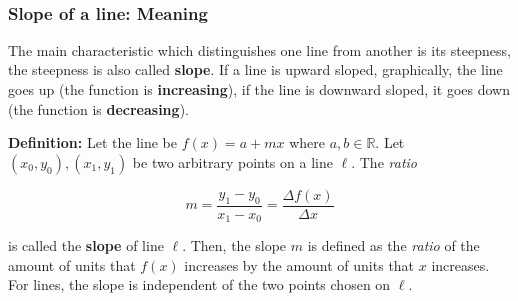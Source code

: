 \documentclass[11pt]{article}
\begin{document}
    \begin{center}
    \end{center}
    { \hspace*{\fill} \\}
    
    \hypertarget{slope-of-a-line-meaning}{%
\subsubsection{Slope of a line: Meaning}\label{slope-of-a-line-meaning}}

The main characteristic which distinguishes one line from another is its
steepness, the steepness is also called \textbf{slope}. If a line is
upward sloped, graphically, the line goes up (the function is
\textbf{increasing}), if the line is downward sloped, it goes down (the
function is \textbf{decreasing}).

\textbf{Definition:} Let the line be \(f(x) = a + m x\) where
\(a,b\in\mathbb{R}\). Let \((x_0,y_0),(x_1,y_1)\) be two arbitrary
points on a line \(\ell\). The \emph{ratio}

\[
m = \frac{y_1-y_0}{x_1-x_0} = \frac{\Delta f(x)}{\Delta x}
\]

is called the \textbf{slope} of line \(\ell\). Then, the slope \(m\) is
defined as the \emph{ratio} of the amount of units that \(f(x)\)
increases by the amount of units that \(x\) increases. For lines, the
slope is independent of the two points chosen on \(\ell\).
\end{document}
